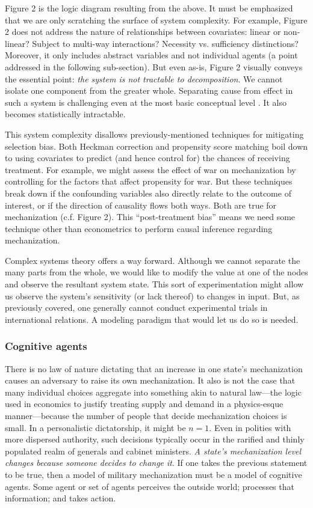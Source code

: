 \documentclass{article}
\begin{document}
Figure 2 is the logic diagram resulting from the above. It must be emphasized that we are only scratching the 
surface of system complexity. For example, Figure 2 does not address the nature of relationships 
between covariates: linear or non-linear? Subject to multi-way
interactions? Necessity vs. sufficiency distinctions? Moreover, it only includes 
abstract variables and not individual agents (a point addressed in the following
sub-section). But even as-is, Figure 2 visually conveys the essential point: \textit{the system is
not tractable to decomposition}. We cannot isolate one component from the
greater whole. Separating cause from effect in such a system is challenging even
at the most basic conceptual level
\citep{pearl2009causality}. It also becomes statistically intractable.

This system complexity disallows previously-mentioned
techniques for mitigating selection bias. Both Heckman correction and propensity score
matching boil down to using covariates to predict (and hence control for) the chances 
of receiving treatment. For example, we might assess the effect of war on
mechanization by controlling for the factors that affect propensity for war. 
But these techniques break down if the confounding variables also directly
relate to the outcome of interest, or if the direction of causality flows both
ways. Both are true for mechanization 
(c.f. Figure 2). This ``post-treatment bias'' \citep{king2010hard} means we need
some technique other than econometrics to perform causal inference regarding
mechanization.

Complex systems theory \citep[ultimately stemming to][]{simon1996artificial}
offers a way forward. Although we cannot separate the many parts from the whole,
we would like to modify the value at one of the nodes and observe the resultant system state. This sort of
experimentation might allow us observe the system's sensitivity (or lack thereof) to changes
in input. But, as previously covered, one generally cannot conduct
experimental trials in international relations.  A modeling paradigm that would let us do so is needed.

\subsubsection{Cognitive agents}

There is no law of nature dictating that an increase in one state's mechanization causes an adversary to 
raise its own mechanization. It also is not the case that many individual choices aggregate into something 
akin to natural law---the logic used 
in economics to justify treating supply and demand in a physics-esque manner---because the number of
people that decide mechanization choices is small. In a personalistic
dictatorship, it might be $n=1$. Even in polities with more dispersed authority, such decisions
typically occur in the rarified and thinly populated realm of generals and cabinet ministers. 
\textit{A state's mechanization level changes because someone decides to change it}. If one takes 
the previous statement to be true, then a model of military mechanization must be a model of 
cognitive agents.  Some agent or set of agents perceives the outside
world; processes that information; and takes action. 
\end{document}
